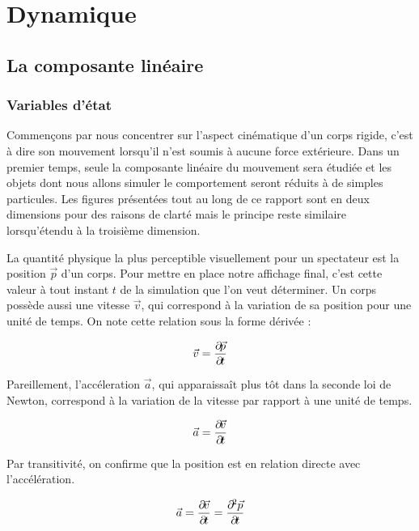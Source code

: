 \section{Dynamique} 

\subsection{La composante linéaire}

\subsubsection{Variables d'état}

Commençons par nous concentrer sur l'aspect cinématique d'un corps
rigide, c'est à dire son mouvement lorsqu'il n'est soumis à aucune
force extérieure. Dans un premier temps, seule la composante linéaire
du mouvement sera étudiée et les objets dont nous allons simuler le
comportement seront réduits à de simples particules. Les figures
présentées tout au long de ce rapport sont en deux dimensions pour des
raisons de clarté mais le principe reste similaire lorsqu'étendu à la
troisième dimension.

La quantité physique la plus perceptible visuellement pour un
spectateur est la position $\vec p$ d'un corps. Pour mettre en place
notre affichage final, c'est cette valeur à tout instant $t$ de la
simulation que l'on veut déterminer. Un corps possède aussi une
vitesse $\vec v$, qui correspond à la variation de sa position pour
une unité de temps. On note cette relation sous la forme dérivée :

\begin{align*}
  \vec{v} = \frac{\partial \! \vec{p}}{\partial \! t} \\
\end{align*}

Pareillement, l'accéleration $\vec a$, qui apparaissaît plus tôt dans
la seconde loi de Newton, correspond à la variation de la vitesse par
rapport à une unité de temps.

\begin{align*}
  \vec{a} = \frac{\partial \! \vec{v}}{\partial \! t} \\
\end{align*}

Par transitivité, on confirme que la position est en relation directe
avec l'accélération.

\begin{align*}
  \vec{a} = \frac{\partial \! \vec{v}}{\partial \! t} = \frac{\partial \!^2 \vec{p}}{\partial \! t} \\
\end{align*}

